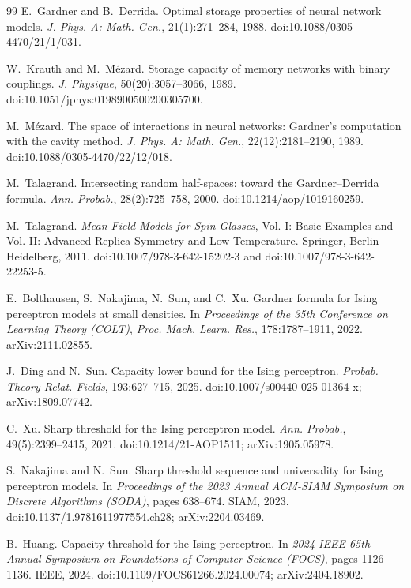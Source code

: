 \documentclass[11pt]{article}
\begin{document}
\begin{thebibliography}{99}
E.~Gardner and B.~Derrida.
\newblock Optimal storage properties of neural network models.
\newblock \emph{J. Phys. A: Math. Gen.}, 21(1):271--284, 1988.
\newblock doi:10.1088/0305-4470/21/1/031.

W.~Krauth and M.~M{\'e}zard.
\newblock Storage capacity of memory networks with binary couplings.
\newblock \emph{J. Physique}, 50(20):3057--3066, 1989.
\newblock doi:10.1051/jphys:0198900500200305700.

M.~M{\'e}zard.
\newblock The space of interactions in neural networks: Gardner's computation with the cavity method.
\newblock \emph{J. Phys. A: Math. Gen.}, 22(12):2181--2190, 1989.
\newblock doi:10.1088/0305-4470/22/12/018.

M.~Talagrand.
\newblock Intersecting random half-spaces: toward the Gardner--Derrida formula.
\newblock \emph{Ann. Probab.}, 28(2):725--758, 2000.
\newblock doi:10.1214/aop/1019160259.

M.~Talagrand.
\newblock \emph{Mean Field Models for Spin Glasses}, Vol. I: Basic Examples and Vol. II: Advanced Replica-Symmetry and Low Temperature.
\newblock Springer, Berlin Heidelberg, 2011.
\newblock doi:10.1007/978-3-642-15202-3 and doi:10.1007/978-3-642-22253-5.

E.~Bolthausen, S.~Nakajima, N.~Sun, and C.~Xu.
\newblock Gardner formula for Ising perceptron models at small densities.
\newblock In \emph{Proceedings of the 35th Conference on Learning Theory (COLT)}, \emph{Proc. Mach. Learn. Res.}, 178:1787--1911, 2022.
\newblock arXiv:2111.02855.

J.~Ding and N.~Sun.
\newblock Capacity lower bound for the Ising perceptron.
\newblock \emph{Probab. Theory Relat. Fields}, 193:627--715, 2025.
\newblock doi:10.1007/s00440-025-01364-x; arXiv:1809.07742.

C.~Xu.
\newblock Sharp threshold for the Ising perceptron model.
\newblock \emph{Ann. Probab.}, 49(5):2399--2415, 2021.
\newblock doi:10.1214/21-AOP1511; arXiv:1905.05978.

S.~Nakajima and N.~Sun.
\newblock Sharp threshold sequence and universality for Ising perceptron models.
\newblock In \emph{Proceedings of the 2023 Annual ACM-SIAM Symposium on Discrete Algorithms (SODA)}, pages 638--674. SIAM, 2023.
\newblock doi:10.1137/1.9781611977554.ch28; arXiv:2204.03469.

B.~Huang.
\newblock Capacity threshold for the Ising perceptron.
\newblock In \emph{2024 IEEE 65th Annual Symposium on Foundations of Computer Science (FOCS)}, pages 1126--1136. IEEE, 2024.
\newblock doi:10.1109/FOCS61266.2024.00074; arXiv:2404.18902.


\end{thebibliography}
\end{document}
